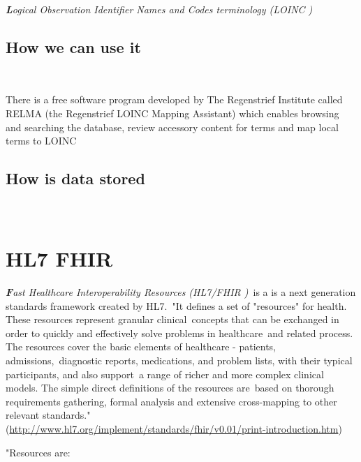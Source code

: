 \documentclass[DIV=calc, paper=a4, fontsize=12pt, onecolumn]{scrartcl}	 %
\newcommand{\initial}[1]{ %
\lettrine[lines=3,lhang=0.3,nindent=0em,slope=0em]{
\color{DarkBlue}
{\textbf{\textit{#1}}}}{}}
\begin{document}
{\initial{L}\textit{ogical Observation Identifier Names and Codes terminology (LOINC )}\\



\subsection{How we can use it}\

There is a free software program developed by The Regenstrief Institute called RELMA (the Regenstrief LOINC Mapping Assistant) which enables browsing and searching the database, review accessory content for terms and map local terms to LOINC \cite{kroth_using_2012} 

\subsection{How is data stored}\


\section[Fast Healthcare Interoperability Resources (HL7 FHIR\textsuperscript{\texttrademark})]
{HL7 FHIR \textsuperscript{\texttrademark}}
  \label{sec:fhir}

\initial{F}\textit{ast Healthcare Interoperability Resources (HL7/FHIR )}\
is a is a next generation standards framework created by HL7.\
"It defines a set of "resources" for health. These resources represent granular clinical\
concepts that can be exchanged in order to quickly and effectively solve problems in healthcare\
 and related process. The resources cover the basic elements of healthcare - patients, admissions,\
diagnostic reports, medications, and problem lists, with their typical participants, and also support\
a range of richer and more complex clinical models. The simple direct definitions of the resources are\
 based on thorough requirements gathering, formal analysis and extensive cross-mapping to other relevant standards."\\
  (\url{http://www.hl7.org/implement/standards/fhir/v0.01/print-introduction.htm})

"Resources are:\

}
\end{document}

